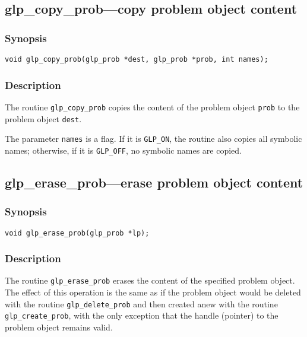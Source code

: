 \subsection{glp\_copy\_prob---copy problem object content}

\subsubsection*{Synopsis}

\begin{verbatim}
void glp_copy_prob(glp_prob *dest, glp_prob *prob, int names);
\end{verbatim}

\subsubsection*{Description}

The routine \verb|glp_copy_prob| copies the content of the problem
object \verb|prob| to the problem object \verb|dest|.

The parameter \verb|names| is a flag. If it is \verb|GLP_ON|,
the routine also copies all symbolic names; otherwise, if it is
\verb|GLP_OFF|, no symbolic names are copied.

\subsection{glp\_erase\_prob---erase problem object content}

\subsubsection*{Synopsis}

\begin{verbatim}
void glp_erase_prob(glp_prob *lp);
\end{verbatim}

\subsubsection*{Description}

The routine \verb|glp_erase_prob| erases the content of the specified
problem object. The effect of this operation is the same as if the
problem object would be deleted with the routine \verb|glp_delete_prob|
and then created anew with the routine \verb|glp_create_prob|, with the
only exception that the handle (pointer) to the problem object remains
valid.

